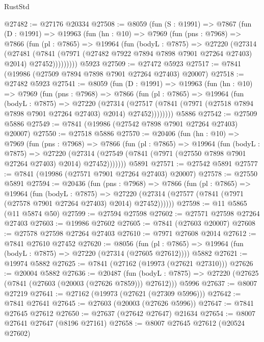 \begin{lexlean}{RustStd}
\begin{coremodule}
@27482 := @27176 @20334
@27508 := @8059
    (fun (S : @1991) =>
    @7867
      (fun (D : @1991) =>
      @19963
        (fun (hn : @10) =>
        @7969
          (fun (pns : @7968) =>
          @7866
            (fun (pl : @7865) =>
            @19964
              (fun (bodyL : @7875) =>
              @27220
                (@27314
                  (@27481
                    (@7841
                      (@7971 (@27482 @7922 @7894 @7898 @7901 @27264 @27403) @2014)
                      @27452)))))))))
    @5923
@27509 := @27472 @5923
@27517 := @7841 (@19986 (@27509 @7894 @7898 @7901 @27264 @27403) @20007)
@27518 := @27482 @5923
@27541 := @8059
    (fun (D : @1991) =>
    @19963
      (fun (hn : @10) =>
      @7969
        (fun (pns : @7968) =>
        @7866
          (fun (pl : @7865) =>
          @19964
            (fun (bodyL : @7875) =>
            @27220
              (@27314
                (@27517 (@7841 (@7971 (@27518 @7894 @7898 @7901 @27264 @27403) @2014) @27452))))))))
    @5886
@27542 := @27509 @5886
@27549 := @7841 (@19986 (@27542 @7898 @7901 @27264 @27403) @20007)
@27550 := @27518 @5886
@27570 := @20406
    (fun (hn : @10) =>
    @7969
      (fun (pns : @7968) =>
      @7866
        (fun (pl : @7865) =>
        @19964
          (fun (bodyL : @7875) =>
          @27220
            (@27314 (@27549 (@7841 (@7971 (@27550 @7898 @7901 @27264 @27403) @2014) @27452)))))))
    @5891
@27571 := @27542 @5891
@27577 := @7841 (@19986 (@27571 @7901 @27264 @27403) @20007)
@27578 := @27550 @5891
@27594 := @20436
    (fun (pns : @7968) =>
    @7866
      (fun (pl : @7865) =>
      @19964
        (fun (bodyL : @7875) =>
        @27220 (@27314 (@27577 (@7841 (@7971 (@27578 @7901 @27264 @27403) @2014) @27452))))))
@27598 := @11 @5865 (@11 @5874 @50)
@27599 := @27594 @27598
@27602 := @27571 @27598 @27264 @27403
@27603 := @19986 @27602
@27605 := @7841 (@27603 @20007)
@27608 := @27578 @27598 @27264 @27403
@27610 := @7971 @27608 @2014
@27612 := @7841 @27610 @27452
@27620 := @8056
    (fun (pl : @7865) => @19964 (fun (bodyL : @7875) => @27220 (@27314 (@27605 @27612))))
    @5882
@27621 := @19974 @5882
@27625 := @7841 (@27162 (@19973 (@27621 @27310)))
@27626 := @20004 @5882
@27636 := @20487
    (fun (bodyL : @7875) => @27220 (@27625 (@7841 (@27603 (@20003 (@27626 @7859))) @27612)))
    @5996
@27637 := @8007 @27219
@27641 := @27162 (@19973 (@27621 (@27309 @5996)))
@27642 := @7841 @27641
@27645 := @27603 (@20003 (@27626 @5996))
@27647 := @7841 @27645 @27612
@27650 := @27637 (@27642 @27647) @21634
@27654 := @8007 @27641 @27647 (@8196 @27161)
@27658 := @8007 @27645 @27612 (@20524 @27602)

\end{coremodule}
\end{lexlean}
